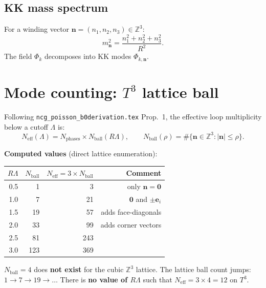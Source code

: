 \documentclass[12pt,a4paper]{article}
\newcommand{\Neff}{N_{\mathrm{eff}}}
\newcommand{\ZZ}{\mathbb{Z}}
\begin{document}
\subsection{KK mass spectrum}

For a winding vector $\mathbf{n} = (n_1, n_2, n_3) \in \ZZ^3$:
\begin{equation}
  m^2_{\mathbf{n}} = \frac{n_1^2 + n_2^2 + n_3^2}{R^2}.
\end{equation}
The field $\Phi_k$ decomposes into KK modes $\Phi_{k,\mathbf{n}}$.

\section{Mode counting: $T^3$ lattice ball}
\label{sec:t3count}

Following \texttt{ncg\_poisson\_b0derivation.tex} Prop.~1, the effective loop
multiplicity below a cutoff $\Lambda$ is:
\begin{equation}
  \Neff(\Lambda) = N_{\mathrm{phases}} \times N_{\mathrm{ball}}(R \Lambda),
  \qquad
  N_{\mathrm{ball}}(\rho) = \#\{\mathbf{n} \in \ZZ^3 : |\mathbf{n}| \le \rho\}.
\end{equation}

\textbf{Computed values} (direct lattice enumeration):

\begin{center}
\begin{tabular}{rrrr}
\toprule
$R\Lambda$ & $N_{\mathrm{ball}}$ & $\Neff = 3 \times N_{\mathrm{ball}}$ & Comment \\
\midrule
0.5 & 1   & 3   & only $\mathbf{n}=\mathbf{0}$ \\
1.0 & 7   & 21  & $\mathbf{0}$ and $\pm\mathbf{e}_i$ \\
1.5 & 19  & 57  & adds face-diagonals \\
2.0 & 33  & 99  & adds corner vectors \\
2.5 & 81  & 243 & \\
3.0 & 123 & 369 & \\
\bottomrule
\end{tabular}
\end{center}

\begin{resultbox}
$N_{\mathrm{ball}} = 4$ does \textbf{not exist} for the cubic $\ZZ^3$ lattice.
The lattice ball count jumps: $1 \to 7 \to 19 \to \ldots$
There is \textbf{no value of $R\Lambda$} such that $\Neff = 3 \times 4 = 12$
on $T^3$.
\end{resultbox}
\end{document}
